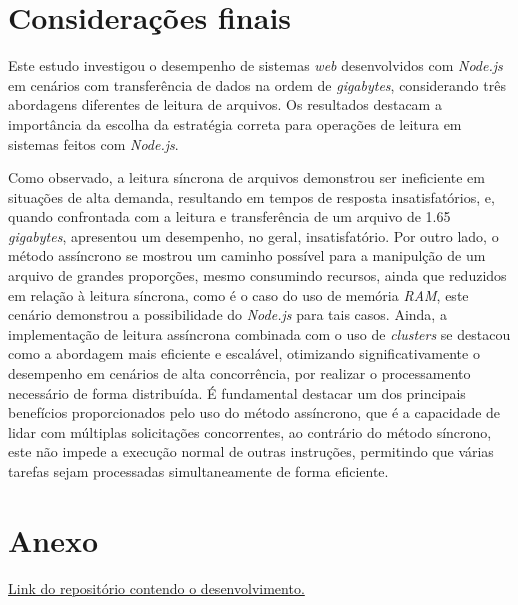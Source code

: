 \documentclass[12pt]{article}
\begin{document}
\section{Considerações finais}

Este estudo investigou o desempenho de sistemas \textit{web} desenvolvidos com \textit{Node.js} em cenários com transferência de dados
na ordem de \textit{gigabytes}, considerando três abordagens diferentes de leitura de arquivos. Os resultados destacam
a importância da escolha da estratégia correta para operações de leitura em sistemas feitos com \textit{Node.js}.

Como observado, a leitura síncrona de arquivos demonstrou ser ineficiente em situações de alta demanda, resultando em 
tempos de resposta insatisfatórios, e, quando confrontada com a leitura e transferência de um arquivo de 1.65 \textit{gigabytes},
apresentou um desempenho, no geral, insatisfatório. Por outro lado, o método assíncrono se mostrou um caminho possível para a manipulção de um arquivo de
grandes proporções, mesmo consumindo recursos, ainda que reduzidos em relação à leitura síncrona, como é o caso do uso de
memória \textit{RAM}, este cenário demonstrou a possibilidade do \textit{Node.js} para tais casos. Ainda, a implementação 
de leitura assíncrona combinada com o uso de \textit{clusters} se destacou como a abordagem mais eficiente e escalável, otimizando 
significativamente o desempenho em cenários de alta concorrência, por realizar o processamento necessário de forma distribuída. 
É fundamental destacar um dos principais benefícios proporcionados pelo uso do método assíncrono, que é a capacidade de lidar 
com múltiplas solicitações concorrentes, ao contrário do método síncrono, este não impede a execução normal 
de outras instruções, permitindo que várias tarefas sejam processadas simultaneamente de forma eficiente.




\pagebreak

\section*{Anexo}

\href{https://github.com/MarcosKrul/tcc}{Link do repositório contendo o desenvolvimento.}
\end{document}
